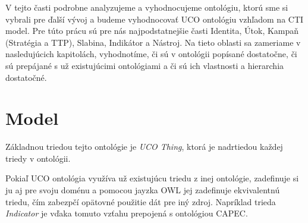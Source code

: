 \documentclass[12pt, a4paper, oneside]{book}
\begin{document}
V tejto časti podrobne analyzujeme a vyhodnocujeme ontológiu\citep{ucoSource}, ktorú sme si vybrali pre ďalší vývoj a budeme vyhodnocovať UCO ontológiu vzhľadom na CTI model. Pre túto prácu sú pre nás najpodstatnejšie časti Identita, Útok, Kampaň (Stratégia a TTP), Slabina, Indikátor a Nástroj. Na tieto oblasti sa zameriame v nasledujúcich kapitolách, vyhodnotíme, či sú v ontológii popísané dostatočne, či sú prepájané s už existujúcimi ontológiami a či sú ich vlastnosti a hierarchia dostatočné. 


\section{Model}

Základnou triedou tejto ontológie je \textit{UCO Thing}, ktorá je nadrtiedou každej triedy v ontológii.


Pokiaľ UCO ontológia využíva už existujúcu triedu z inej ontológie, zadefinuje si ju aj pre svoju doménu a pomocou jayzka OWL jej zadefinuje ekvivalentnú triedu, čím zabezpčí opätovné použitie dát pre iný zdroj. Napríklad trieda \textit{Indicator} je vďaka tomuto vzťahu prepojená s ontológiou CAPEC.

\end{document}
